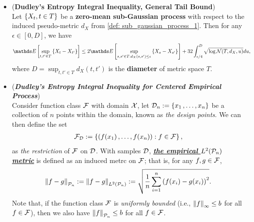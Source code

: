 \documentclass[11pt]{article}
\begin{document}
\begin{itemize}
\item \begin{theorem} (\textbf{Dudley's Entropy Integral Inequality, General Tail Bound}) \citep{wainwright2019high}\\
Let $\left\{X_{t}, t \in T\right\}$ be a \textbf{zero-mean sub-Gaussian process}  with respect to the induced pseudo-metric $d_X$ from \eqref{def: sub_gaussian_process_1}. Then for any $\epsilon \in [0, D]$,  we have
\begin{align}
\E{}{\sup_{t, t' \in T}\set{X_t - X_{t'}}} &\le 2\E{}{\sup_{s, s' \in T: d_X(s, s') \le \epsilon}\set{X_s - X_{s'}}} + 32 \int_{\epsilon/4}^{D}\sqrt{\log \cN(T, d_{X}, u)} du, \label{ineqn: dudley_metric_entropy_integral_inequality_tail_difference_general}
\end{align} where $D  = \sup_{t, t'\in T}d_{X}(t, t')$ is the \textbf{diameter} of metric space $T$.
\end{theorem}

\item \begin{remark} (\textbf{\emph{Dudley's Entropy Integral Inequality for Centered Empirical Process}}) \\
Consider function class ${\mathcal F}$ with domain ${\mathcal X}$, let  ${\mathcal D}_n := \left\{x_1 \,{,}\ldots{,}\, x_n\right\}$ be a collection of $n$ points within the domain, known as \emph{the design points}. We can then define the set
\begin{align*}
{\mathcal F}_{{\mathcal D}} := \left\{(f(x_1) \,{,}\ldots{,}\, f(x_n)): f \in {\mathcal F}\right\},
\end{align*} as \emph{the restriction} of ${\mathcal F}$ on ${\mathcal D}$. With samples ${\mathcal D}$, \underline{\emph{\textbf{the empirical $L^2({\mathcal P}_n)$ metric}}}  is defined as an induced metrc on ${\mathcal F}$; that is, for any $f, g \in {\mathcal F}$,
\begin{align}
\left\|f - g\right\|_{{\mathcal P}_n} := \left\|f - g\right\|_{L^2({\mathcal P}_n)} := \sqrt{\frac{1}{n}\sum_{i=1}^n\left(f(x_i) - g(x_i)\right)^2}.
\label{def: emp_distance}
\end{align} Note that, if the function class ${\mathcal F}$ is \emph{uniformly bounded} (i.e.,  $\left\|f\right\|_{\infty} \le b$ for all $f \in {\mathcal F}$), then we also have $\left\|f\right\|_{{\mathcal P}_n} \le b$ for all $f \in {\mathcal F}$. 


\end{remark}
\end{itemize}
\end{document}
